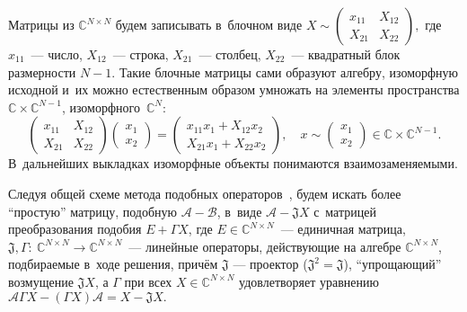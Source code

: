 Матрицы из \( \mathbb{C}^{N{\times}N} \) будем записывать в~блочном виде
\( X \sim
    \begin{pmatrix}
    x_{11} & X_{12} \\
    X_{21} & X_{22}
    \end{pmatrix}, \)
    где \( x_{11} \)~--- число,
    \( X_{12} \)~--- строка, \( X_{21} \)~--- столбец,
    \( X_{22} \)~--- квадратный блок размерности \( N-1 \).
Такие блочные матрицы сами образуют алгебру, изоморфную исходной
и~их можно естественным образом умножать
на элементы пространства \( \mathbb{C}\times\mathbb{C}^{N-1} \),
изоморфного~\( \mathbb{C}^N \):
\[
    \begin{pmatrix}
    x_{11} & X_{12} \\
    X_{21} & X_{22}
    \end{pmatrix}
    \begin{pmatrix} x_1 \\ x_2 \end{pmatrix}
  = \begin{pmatrix}
      x_{11} x_1 + X_{12} x_2 \\
      X_{21} x_1 + X_{22} x_2
      \end{pmatrix},\quad x \sim \begin{pmatrix} x_1 \\ x_2 \end{pmatrix}\in \mathbb{C}\times\mathbb{C}^{N-1}.
    \]
В~дальнейших выкладках изоморфные объекты понимаются взаимозаменяемыми.

Следуя общей схеме метода подобных операторов~\cite{baskakov-harmonic,baskakov1983},
будем искать более ``простую'' матрицу, подобную \( \mathcal{A} - \mathcal{B} \),
в~виде \( \mathcal{A} - \mathfrak{J} X \)
с~матрицей преобразования подобия \( E + \Gamma X \),
где \( E\in{\mathbb{C}^{N{\times}N}} \)~--- единичная матрица,
\( \mathfrak{J},\Gamma{:}\ \mathbb{C}^{N{\times}N}{\to}\mathbb{C}^{N{\times}N} \)~--- линейные операторы,
действующие на алгебре \( \mathbb{C}^{N{\times}N} \), подбираемые
в~ходе решения,
      прич\"ем \( \mathfrak{J} \) --- проектор (\(\mathfrak{J}^2=\mathfrak{J}\)),
      ``упрощающий'' возмущение \( \mathfrak{J}X \),
      а \( \Gamma \)
      при всех \( X\in {\mathbb{C}^{N{\times}N}} \)
      удовлетворяет уравнению
          \( \mathcal{A}\Gamma X - (\Gamma X) \mathcal{A} = X - \mathfrak{J}X. \)

